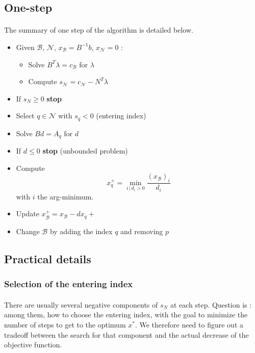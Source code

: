 \documentclass[a4paper]{article}
\begin{document}
{{		}
		\subsection{One-step}
		{
			\paragraph{} The summary of one step of the algorithm is detailed below. 
			\vspace{10pt}
			
			{
				\begin{itemize}
					\item Given $\mathcal{B}, \, \mathcal{N}$, $x_\mathcal{B} = B^{-1}b$, $x_\mathcal{N}=0$ : 
					\begin{itemize}[label=-]
						\item Solve $B^T\lambda = c_\mathcal{B}$ for $\lambda$
						\item Compute $s_\mathcal{N} = c_\mathcal{N} - N^T\lambda$
					\end{itemize}
					\item If $s_N\geq 0$  \textbf{stop}
					\item Select $q\in\mathcal{N}$ with $s_q<0$ (entering index) 
					\item Solve $Bd = A_q$ for $d$
					\item If $d\leq 0$ \textbf{stop} (unbounded problem)
					\item Compute 
					\begin{equation}
						x_q^+ = \min_{i\,\vert \, d_i>0}\frac{(x_\mathcal{B})_i}{d_i}
					\end{equation}
					with $i$ the arg-minimum. 
					\item Update $x_\mathcal{B}^+ = x_\mathcal{B} - dx_q+ $
					\item Change $\mathcal{B}$ by adding the index $q$ and removing $p$
				\end{itemize}
			}
			
		}
		\subsection{Practical details}
		{
			\subsubsection{Selection of the entering index}
			{
				\paragraph{} There are usually several negative components of $s_N$ at each step. Question is : among them, how to choose the entering index, with the goal to minimize the number of steps to get to the optimum $x^*$. We therefore need to figure out a tradeoff between the search for that component and the actual decrease of the objective function. 
				
}}}
\end{document}
